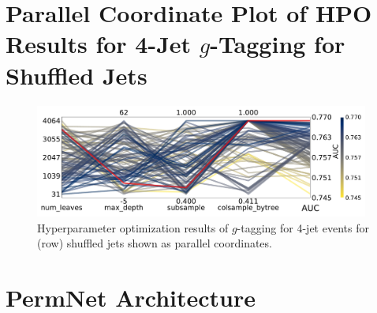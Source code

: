 \section[Parallel Coordinate Plot of HPO Results for 4-Jet g-Tagging for Shuffled Jets]{Parallel Coordinate Plot of HPO Results for 4-Jet $g$-Tagging for Shuffled Jets}
\begin{figure}[h!]
  \includegraphics[width=0.98\textwidth, trim=0 0 0 0, clip]{figures/quarks/CV_viz-njet=4-name=lf_gtag_shuffled_lgb_down_sample=1.00-ML_vars=vertex-selection=b-ejet_min=4-n_iter_RS_lgb=99-n_iter_RS_xgb=9-cdot_cut=0.90-version=19.pdf}
  \caption[Parallel Coordinate Plot of HPO Results for 4-Jet $g$-Tagging for Shuffled Jets]
          {Hyperparameter optimization results of $g$-tagging for 4-jet events for (row) shuffled jets shown as parallel coordinates. 
          } 
  \label{fig:q:CV_res_parallel_coords_g_tag_4j_shuffled}
\end{figure}
\clearpage



\FloatBarrier
\section{PermNet Architecture}

